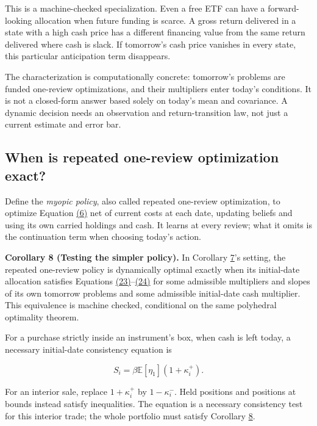 \documentclass[11pt]{article}
\begin{document}
This is a machine-checked specialization. Even a free ETF can have a forward-looking allocation when future funding is scarce. A gross return delivered in a state with a high cash price has a different financing value from the same return delivered where cash is slack. If tomorrow's cash price vanishes in every state, this particular anticipation term disappears.

The characterization is computationally concrete: tomorrow's problems are funded one-review optimizations, and their multipliers enter today's conditions. It is not a closed-form answer based solely on today's mean and covariance. A dynamic decision needs an observation and return-transition law, not just a current estimate and error bar.

\subsection{When is repeated one-review optimization exact?}\label{sec:4.4}

Define the \emph{myopic policy}, also called repeated one-review optimization, to optimize Equation \hyperref[eq:6]{(6)} net of current costs at each date, updating beliefs and using its own carried holdings and cash. It learns at every review; what it omits is the continuation term when choosing today's action.

\label{res:Corollary-8}
\textbf{Corollary 8 (Testing the simpler policy).} In Corollary \hyperref[res:Corollary-7]{7}'s setting, the repeated one-review policy is dynamically optimal exactly when its initial-date allocation satisfies Equations \hyperref[eq:23]{(23)}--\hyperref[eq:24]{(24)} for some admissible multipliers and slopes of its own tomorrow problems and some admissible initial-date cash multiplier. This equivalence is machine checked, conditional on the same polyhedral optimality theorem.

For a purchase strictly inside an instrument's box, when cash is left today, a necessary initial-date consistency equation is

\begin{equation*}
S_i=\beta\mathbb E[\eta_1](1+\kappa_i^+).
\tag{28}\label{eq:28}
\end{equation*}

For an interior sale, replace \(1+\kappa_i^+\) by \(1-\kappa_i^-\). Held positions and positions at bounds instead satisfy inequalities. The equation is a necessary consistency test for this interior trade; the whole portfolio must satisfy Corollary \hyperref[res:Corollary-8]{8}.
\end{document}
